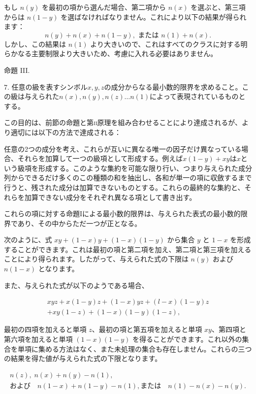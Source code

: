 \documentclass[a4paper,11pt,openany]{ltjsbook}
\begin{document}
もし $n(y)$ を最初の項から選んだ場合、第二項から $n(x)$ を選ぶと、第三項からは $n(1-y)$ を選ばなければなりません。これにより以下の結果が得られます：
\[
n(y) + n(x) + n(1 - y), \text{ または } n(1) + n(x).
\]
しかし、この結果は $n(1)$ より大きいので、これはすべてのクラスに対する明らかなる主要制限より大きいため、考慮に入れる必要はありません。

\begin{center}
\textsc{命題 III.}
\end{center}

7. 任意の級を表すシンボル$x, y, z$の成分からなる最小数的限界を求めること。この級は与えられた$n(x), n(y), n(z) \dotsc n(1)$によって表現されているものとする。

この目的は、前節の命題と第\textsc{ii}原理を組み合わせることにより達成されるが、より適切には以下の方法で達成される：

任意の2つの成分を考え、これらが互いに異なる唯一の因子だけ異なっている場合、それらを加算して一つの級項として形成する。例えば$x(1 - y) + xy$は$x$という級項を形成する。このような集約を可能な限り行い、つまり与えられた成分列からできるだけ多くのこの種類の和を抽出し、各和が単一の項に収斂するまで行うと、残された成分は加算できないものとする。これらの最終的な集約と、それらを加算できない成分をそれぞれ異なる項として書き出す。

これらの項に対する命題Iによる最小数的限界は、与えられた表式の最小数的限界であり、その中からただ一つが正となる。

次のように、式 $xy + (1 - x)y + (1 - x)(1 - y)$ から集合 $y$ と $1 - x$ を形成することができます。これは最初の項と第二項を加え、第二項と第三項を加えることにより得られます。したがって、与えられた式の下限は $n(y)$ および $n(1 - x)$ となります。

また、与えられた式が以下のようである場合、

\begin{multline*}
xyz + x (1-y) z + (1-x) yz + (l-x) (1-y) z\\
+ xy(1-z) +(1-x)(1-y)(1-z),
\end{multline*}

最初の四項を加えると単項 $z$、最初の項と第五項を加えると単項 $xy$、第四項と第六項を加えると単項 $(1-x) (1-y)$ を得ることができます。これ以外の集合を単項に集める方法はなく、また未処理の集合も存在しません。これらの三つの結果を得た値が与えられた式の下限となります。

\begin{gather*}
n(z), \; n(x) + n(y) - n(1),\\
\text{および}\quad
n(1-x) + n(1-y) - n(1), \text{または} \quad n(1) - n(x) - n(y).
\end{gather*}
\end{document}
